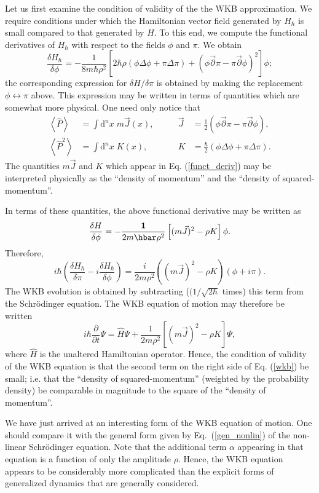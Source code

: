 \documentclass[12pt,aps,eqsecnum,tighten]{revtex4-2}
\def\be{\begin{equation}}
\def\ee{\end{equation}}
\def\a{\alpha}
\def\d{{\mathrm d}}
\def\i{{i}}
\def\1{{\bf 1}}
\begin{document}
Let us first examine the condition of validity of the the WKB
approximation.  We require conditions under which the
Hamiltonian vector field generated by $H_\hbar$ is small compared to
that generated by $H$.  To this end, we compute the functional
derivatives of $H_\hbar$ with respect to the fields $\phi$ and $\pi$.
We obtain
%
\be \label{funct_deriv}
\frac{\delta H_\hbar}{\delta \phi} = 
-\frac{1}{8m\hbar\rho^2} \left[2\hbar\rho\left( \phi\Delta\phi 
+\pi\Delta\pi \right) + \left( \phi \vec{\partial}\pi -
\pi\vec{\partial}\phi \right)^2\right] \phi;
\ee
%
the corresponding expression for $\delta H / \delta\pi$ is obtained by
making the replacement $\phi \leftrightarrow \pi$ above.  This
expression may be written in terms of quantities which are somewhat
more physical.  One need only notice that
%
\be
\begin{array}{rlrl}
\left< \hat{P} \right> &= \int \d^n \! x \; m\vec{J}(x), \quad
\quad& \vec{J} &= \frac{1}{2} ( \phi\vec{\partial}\pi -
\pi\vec{\partial}\phi ), \\
%
\left< \hat{P}^2 \right> &= \int \d^n \! x \; K(x), \quad
\quad& K &= \frac{\hbar}{2} ( \phi\Delta\phi +
\pi\Delta\pi ).
\end{array}
\ee
%
The quantities $m\vec{J}$ and $K$ which appear in
Eq. (\ref{funct_deriv}) may be interpreted physically as the ``density
of momentum'' and the ``density of squared-momentum''.

In terms of these quantities, the above functional derivative may be
written as
%
\be
\frac{\delta H}{\delta \phi} = -\frac{\1}{2m\hbar\rho^2} \left[
(m\vec{J})^2 - \rho K \right] \phi.
\ee
%
Therefore,
%
\be
\i\hbar\left( \frac{\delta H_\hbar}{\delta \pi} - \i
\frac{\delta H_\hbar}{\delta \phi} \right) =
\frac{\i}{2m\rho^2}\left( (m\vec{J})^2 - \rho K \right)
(\phi + \i\pi). 
\ee
%
The WKB evolution is obtained by subtracting ($(1/\sqrt{2\hbar}$
times) this term from the Schr\"odinger equation.  The WKB equation of
motion may therefore be written
%
\be\label{wkb}
\i\hbar \frac{\partial}{\partial t}\Psi = \hat{H}\Psi + 
\frac{1}{2m\rho^2}\left[(m\vec{J})^2 - \rho K \right] \Psi,
\ee
%
where $\hat{H}$ is the unaltered Hamiltonian operator. Hence, the
condition of validity of the WKB equation is that the second term on
the right side of Eq. (\ref{wkb}) be small; i.e. that the ``density of
squared-momentum'' (weighted by the probability density) be comparable
in magnitude to the square of the ``density of momentum''.


We have just arrived at an interesting form of the WKB equation of
motion. One should compare it with the general form given by
Eq.~(\ref{gen_nonlin}) of the non-linear Schr\"odinger equation. Note
that the additional term $\a$ appearing in that equation is a function
of only the amplitude $\rho$. Hence, the WKB equation appears to be
considerably more complicated than the explicit forms of generalized
dynamics that are generally considered.
\end{document}

